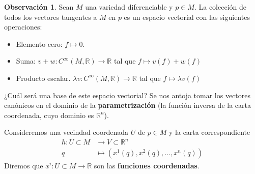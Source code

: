 \documentclass[spanish]{book}
\theoremstyle{definition}
\newtheorem*{obs}{Observación}
\newcommand{\R}{\mathbb{R}}
\begin{document}
	\begin{obs}
		Sean $M$ una variedad diferenciable y $p\in M$. La colección de todos los vectores tangentes a $M$ en $p$ es un espacio vectorial con las siguientes operaciones:
		\begin{itemize}
			\item Elemento cero: $f\mapsto0$.
			\item Suma: $v+w:C^\infty(M,\R)\to\R$ tal que $f\mapsto v(f)+w(f)$
			\item Producto escalar. $\lambda v:C^\infty(M,\R)\to\R$ tal que $f\mapsto\lambda v(f)$
		\end{itemize}
	\end{obs}
	¿Cuál será una base de este espacio vectorial? Se nos antoja tomar los vectores canónicos en el dominio de la \textbf{parametrización} (la función inversa de la carta coordenada, cuyo dominio es $\R^n$).
	
	Consideremos una vecindad coordenada $U$ de $p\in M$ y la carta correspondiente
	\begin{align*}
		h:U\subset M&\to V\subset\R^n\\
		q&\mapsto (x^1(q),x^2(q),\ldots,x^n(q))
	\end{align*}
	Diremos que $x^i:U\subset M\to\R$ son las \textbf{funciones coordenadas}.
	
\end{document}
